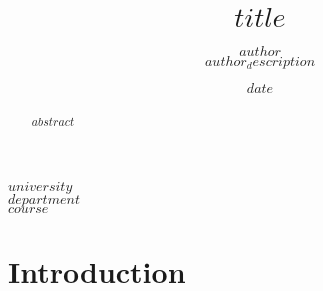 \documentclass[12pt]{article}
\title{\textbf{\LARGE $title$}}
\author{$author$ \\ $author_description$}
\date{$date$}
\begin{document}
\maketitle

\begin{center}
  $university$ \\
  $department$ \\
  $course$ \\
\end{center}

\begin{abstract}
$abstract$
\end{abstract}

\newpage

\section{Introduction}
\end{document}
